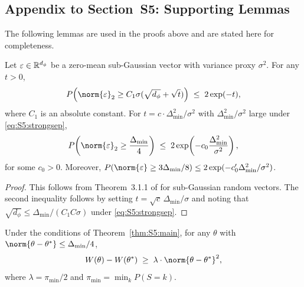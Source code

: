 \subsection*{Appendix to Section~S5: Supporting Lemmas}
\label{sec:S5:app}

The following lemmas are used in the proofs above and are stated here
for completeness.

\begin{lemma}
\label{lem:S5:sgnorm}
Let $\varepsilon\in\mathbb{R}^{d_\phi}$ be a zero-mean sub-Gaussian vector with
variance proxy $\sigma^2$.  For any $t>0$,
\[
P\!\left(\norm{\varepsilon}_2\ge C_1\sigma(\sqrt{d_\phi}+\sqrt{t})\right)
\;\le\; 2\exp(-t),
\]
where $C_1$ is an absolute constant.  For
$t=c\cdot\Delta_{\min}^2/\sigma^2$ with $\Delta_{\min}^2/\sigma^2$
large under \eqref{eq:S5:strongsep},
\[
P\!\left(\norm{\varepsilon}_2\ge\frac{\Delta_{\min}}{4}\right)
\;\le\; 2\exp\!\left(-c_0\frac{\Delta_{\min}^2}{\sigma^2}\right),
\]
for some $c_0>0$.  Moreover,
$P(\norm{\varepsilon}\ge3\Delta_{\min}/8)
\le 2\exp(-c_0'\Delta_{\min}^2/\sigma^2)$.
\end{lemma}

\begin{proof}
This follows from Theorem~3.1.1 of \cite{vershynin2018highdimensional}
for sub-Gaussian random vectors.  The second inequality follows by
setting $t=\sqrt{c}\,\Delta_{\min}/\sigma$ and noting that
$\sqrt{d_\phi}\le\Delta_{\min}/(C_1 C\sigma)$ under
\eqref{eq:S5:strongsep}.
\end{proof}

\begin{lemma}
\label{lem:S5:quad}
Under the conditions of Theorem~\ref{thm:S5:main}, for any $\theta$ with
$\norm{\theta-\theta^*}\le\Delta_{\min}/4$,
\[
W(\theta)-W(\theta^*)\;\ge\;\lambda\cdot\norm{\theta-\theta^*}^2,
\]
where $\lambda=\pi_{\min}/2$ and $\pi_{\min}=\min_k P(S=k)$.
\end{lemma}

